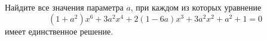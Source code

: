 \begin{ex}
	\begin{condition}
		Найдите все значения параметра \( a \), при каждом из которых уравнение \[ (1+a^2)x^6+3a^2x^4+2(1-6a)x^3+3a^2x^2+a^2+1=0 \] имеет единственное решение.
	\end{condition}
\end{ex}